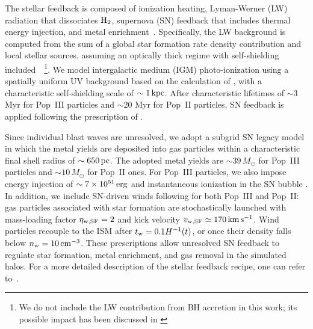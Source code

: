 \documentclass[twocolumn,trackchanges]{aastex701}
\begin{document}
The stellar feedback is composed of ionization heating, Lyman-Werner (LW) radiation that dissociates $\rm H_2$, supernova (SN) feedback that includes thermal energy injection, and metal enrichment~\citep{Jaacks2018, Jaacks2019, Liu2020}. Specifically, the LW background is computed from the sum of a global star formation rate density contribution and local stellar sources, assuming an optically thick regime with self-shielding included~\citep{Liu2020}~\footnote{We do not include the LW contribution from BH accretion in this work; its possible impact has been discussed in \citet{ZhangPBHGalaxy2025ApJ,ZhangDCBHPBH2025ApJ}}. We model intergalactic medium (IGM) photo-ionization  using a spatially uniform UV background based on the calculation of \citet{FaucherUVB2009}, with a characteristic self-shielding scale of $\sim1\,{\rm kpc}$.  After characteristic lifetimes of $\sim3$ Myr for Pop~III particles and $\sim20$ Myr for Pop~II particles, SN feedback is applied following the prescription of \citet{Jaacks2018,Liu2020}.

Since individual blast waves are unresolved, we adopt a subgrid SN legacy model in which the %
metal yields are deposited into gas particles within a characteristic final shell radius of $\sim650\,{\rm pc}$. The adopted metal yields are $\sim39\,M_\odot$ for Pop~III particles and $\sim10\,M_\odot$ for Pop~II ones. %
For Pop~III particles, we also impose energy injection of $\sim7\times10^{51}\,{\rm erg}$ and instantaneous ionization in the SN bubble \citep{Liu2020MNRAS.497.2839L}. %
In addition, we include SN-driven winds following \citet{Springel2003SPH} for both Pop~III and Pop~II: gas particles associated with star formation are stochastically launched with mass-loading factor $\eta_{\rm w,SF}=2$ and kick velocity $v_{\rm w,SF}\simeq170\,{\rm km\,s^{-1}}$. Wind particles recouple to the ISM after $t_{\rm w}=0.1H^{-1}(t)$, or once their density falls below $n_{\rm w}=10\,{\rm cm^{-3}}$. These prescriptions allow unresolved SN feedback to regulate star formation, metal enrichment, and gas removal in the simulated halos. For a more detailed description of the stellar feedback recipe, one can refer to~\citet{Liu2020}.
\end{document}
